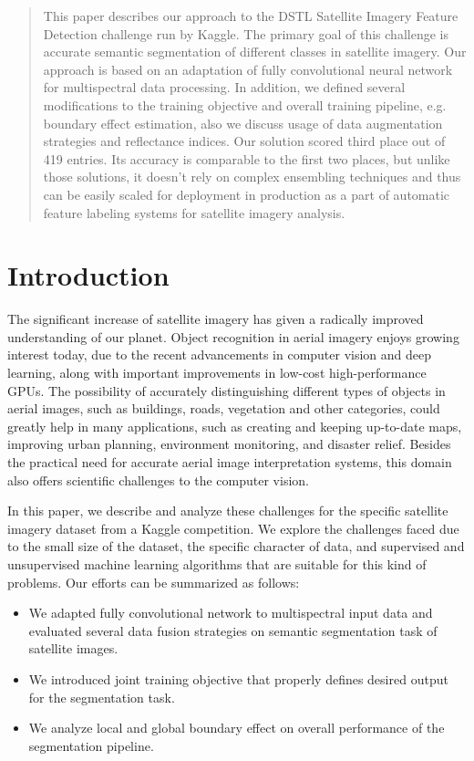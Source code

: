 \documentclass[10pt,twocolumn,letterpaper]{article}
\begin{document}
\begin{abstract}
This paper describes our approach to the DSTL Satellite Imagery Feature Detection challenge \cite{dstl_competition} run by Kaggle. The primary goal of this challenge is accurate semantic segmentation of different classes in satellite imagery. Our approach is based on an adaptation of fully convolutional neural network for multispectral data processing.  In addition, we defined several modifications to the training objective and overall training pipeline, e.g. boundary effect estimation, also we discuss usage of data augmentation strategies and reflectance indices. Our solution scored third place out of 419 entries. Its accuracy is comparable to the first two places, but unlike those solutions, it doesn't rely on complex ensembling techniques and thus can be easily scaled for deployment in production as a part of automatic feature labeling systems for satellite imagery analysis.
\end{abstract}

\section{Introduction}
The significant increase of satellite imagery has given a radically improved understanding of our planet. Object recognition in aerial imagery enjoys growing interest today, due to the recent advancements in computer vision and deep learning, along with important improvements in low-cost high-performance GPUs. The possibility of accurately distinguishing different types of objects in aerial images, such as buildings, roads, vegetation and other categories, could greatly help in many applications, such as creating and keeping up-to-date maps, improving urban planning, environment monitoring, and disaster relief. Besides the practical need for accurate aerial image interpretation systems, this domain also offers scientific challenges to the computer vision.

In this paper, we describe and analyze these challenges for the specific satellite imagery dataset from a Kaggle competition.  We explore the challenges faced due to the small size of the dataset, the specific character of data, and supervised and unsupervised machine learning algorithms that are suitable for this kind of problems. Our efforts  can be summarized as follows:
\begin{itemize}
\item We adapted fully convolutional network to multispectral input data and evaluated several data fusion strategies on semantic segmentation task of satellite images.

\item We introduced joint training objective that properly defines desired output for the segmentation task.

\item We analyze local and global boundary effect on overall performance of the segmentation pipeline.

\end{itemize}
\end{document}
